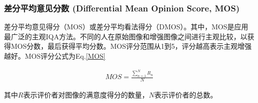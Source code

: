 \documentclass[letterpaper,12pt]{article}
\begin{document}
		\subsubsection{差分平均意见分数 (Differential Mean Opinion Score, MOS)}
		
		差分平均意见得分（MOS）或差分平均看法得分（DMOS）。其中，MOS是应用最广泛的主观IQA方法。不同的人在原始图像和增强图像之间进行主观比较，以获得MOS分数，最后获得平均分数。MOS评分范围从1到5，评分越高表示主观增强越好。MOS评分公式为Eq.\ref{MOS}
		
		\begin{equation}
			\begin{aligned}
				MOS = \frac{\sum_{n=1}^{N} R_{n}} {N}
			\end{aligned}
			\label{eq: MOS}
		\end{equation}
		
		其中$R$表示评价者对图像的满意度得分的数量，$N$表示评价者的总数。
		
	
	
%	
%	
	
\end{document}
